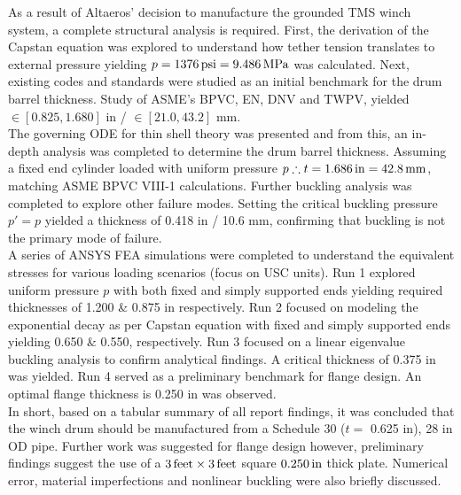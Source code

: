 As a result of Altaeros' decision to manufacture the grounded TMS winch system, a complete structural analysis is required. First, the derivation of the Capstan equation was explored to understand how tether tension translates to external pressure yielding $p=1376\,\mathrm{psi}= 9.486\,\mathrm{MPa}$ was calculated. Next, existing codes and standards were studied as an initial benchmark for the drum barrel thickness. Study of ASME's BPVC, EN, DNV and TWPV, yielded $\in [0.825, 1.680]$ in / $\in [21.0, 43.2]$ mm.\\

The governing ODE for thin shell theory was presented and from this, an in-depth analysis was completed to determine the drum barrel thickness. Assuming a fixed end cylinder loaded with uniform pressure $p \therefore t = 1.686\,\mathrm{in}=42.8\,\mathrm{mm}$, matching ASME BPVC VIII-1 calculations. Further buckling analysis was completed to explore other failure modes. Setting the critical buckling pressure $p'=p$ yielded a thickness of 0.418 in / 10.6 mm, confirming that buckling is not the primary mode of failure.\\

A series of ANSYS FEA simulations were completed to understand the equivalent stresses for various loading scenarios (focus on USC units). Run 1 explored uniform pressure $p$ with both fixed and simply supported ends yielding required thicknesses of 1.200 \& 0.875 in respectively. Run 2 focused on modeling the exponential decay as per Capstan equation with fixed and simply supported ends yielding 0.650 \& 0.550, respectively. Run 3 focused on a linear eigenvalue buckling analysis to confirm analytical findings. A critical thickness of 0.375 in was yielded. Run 4 served as a preliminary benchmark for flange design. An optimal flange thickness is 0.250 in was observed.\\

In short, based on a tabular summary of all report findings, it was concluded that the winch drum should be manufactured from a Schedule 30 ($t=$ 0.625 in), 28 in OD pipe. Further work was suggested for flange design however, preliminary findings suggest the use of a $3\,\mathrm{feet}\times 3\,\mathrm{feet}$ square $0.250\,\mathrm{in}$ thick plate. Numerical error, material imperfections and nonlinear buckling were also briefly discussed.